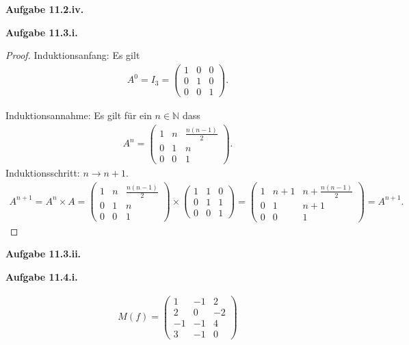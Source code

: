\documentclass[12pt]{extarticle}
\newcommand{\mg}[1]{\mathbb{#1}}
\newcommand{\aufgn}[1]{\textbf{Aufgabe #1.}}
\begin{document}
\aufgn{11.2.iv}

\aufgn{11.3.i}

\begin{proof}
  Induktionsanfang: Es gilt
\begin{align*}
A^0 = I_3 =
  \begin{pmatrix}
    1 & 0 & 0 \\
    0 & 1 & 0 \\
    0 & 0 & 1
  \end{pmatrix}.
\end{align*}

  Induktionsannahme: Es gilt für ein \(n \in \mg{N}\) dass
\begin{align*}
  A^n =
\begin{pmatrix}
  1 & n & \frac{n(n-1)}{2} \\
  0 & 1 & n \\
  0 & 0 & 1
\end{pmatrix}.
\end{align*}
Induktionsschritt: \(n \to n+1\).
\begin{align*}
  A^{n+1} = A^n \times A =
  \begin{pmatrix}
  1 & n & \frac{n(n-1)}{2} \\
  0 & 1 & n \\
  0 & 0 & 1
  \end{pmatrix} \times
\begin{pmatrix}
  1 & 1 & 0 \\
  0 & 1 & 1 \\
  0 & 0 & 1
\end{pmatrix} =
\begin{pmatrix}
  1 & n + 1 & n + \frac{n(n-1)}{2} \\
  0 & 1 & n + 1 \\
  0 & 0 & 1
\end{pmatrix} = A^{n+1}.
\end{align*}
\end{proof}

\aufgn{11.3.ii}

\aufgn{11.4.i}

\begin{align*}
M(f) =
\begin{pmatrix}
  1 & -1 & 2 \\
  2 & 0 & -2 \\
  -1 & -1 & 4 \\
  3 & -1 & 0
\end{pmatrix}
\end{align*}
\end{document}
